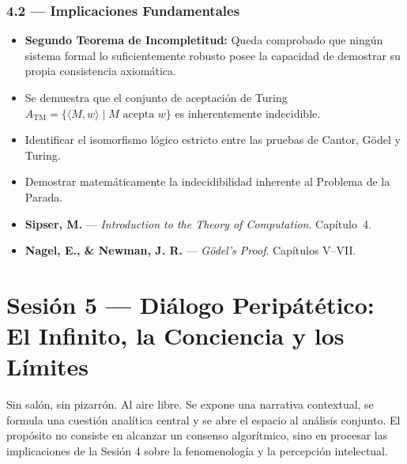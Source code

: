\documentclass[11pt, letterpaper]{article}
\begin{document}
\subsubsection{4.2 --- Implicaciones Fundamentales}
\begin{itemize}
  \item \textbf{Segundo Teorema de Incompletitud:} Queda comprobado que ning\'un sistema formal lo suficientemente robusto posee la capacidad de demostrar su propia consistencia axiom\'atica.
  \item Se demuestra que el conjunto de aceptaci\'on de Turing $A_\text{TM}=\{\langle M,w\rangle\mid M\text{ acepta }w\}$ es inherentemente indecidible.
\end{itemize}

\begin{objetivos}
\begin{itemize}
  \item Identificar el isomorfismo l\'ogico estricto entre las pruebas de Cantor, G\"odel y Turing.
  \item Demostrar matem\'aticamente la indecidibilidad inherente al Problema de la Parada.
\end{itemize}
\end{objetivos}

\begin{lecturas}
\begin{itemize}
  \item[$(\star)$] \textbf{Sipser, M.} --- \emph{Introduction to the Theory of Computation}. Cap\'itulo~4.
  \item[$(\star)$] \textbf{Nagel, E., \& Newman, J. R.} --- \emph{G\"odel's Proof}. Cap\'itulos V--VII.
\end{itemize}
\end{lecturas}

\newpage

\section{Sesi\'on 5 --- Di\'alogo Perip\'at\'etico: El Infinito, la Conciencia y los L\'imites}

\begin{peripatetic}
Sin sal\'on, sin pizarr\'on. Al aire libre. Se expone una narrativa contextual, se formula una cuesti\'on anal\'itica central y se abre el espacio al an\'alisis conjunto. El prop\'osito no consiste en alcanzar un consenso algor\'itmico, sino en procesar las implicaciones de la Sesi\'on 4 sobre la fenomenolog\'ia y la percepci\'on intelectual.
\end{peripatetic}
\end{document}
